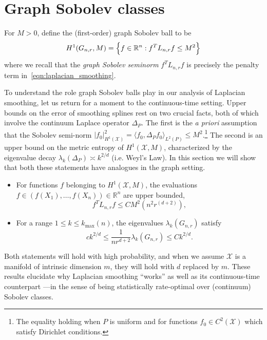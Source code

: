 \documentclass[twoside]{article}
\newcommand{\Reals}{\mathbb{R}}
\newcommand{\1}{\mathbf{1}}
\newcommand{\Lap}{L}
\newcommand{\Xset}{\mathcal{X}}
\newcommand{\Leb}{L}
\theoremstyle{definition}
\theoremstyle{remark}
\begin{document}
\section{Graph Sobolev classes}
\label{sec:graph_sobolev_classes}

For $M > 0$, define the (first-order) graph Sobolev ball to be
\begin{equation}
\label{eqn:graph_sobolev_ball}
H^1(G_{n,r},M) = \Bigl\{f \in \Reals^n: f^T \Lap_{n,r} f \leq M^2\Bigr\}
\end{equation}
where we recall that the \emph{graph Sobolev seminorm} $f^T \Lap_{{n,r}} f$ is precisely the penalty term in~\eqref{eqn:laplacian_smoothing}. 

To understand the role graph Sobolev balls play in our analysis of Laplacian smoothing, let us return for a moment to the continuous-time setting. Upper bounds on the error of smoothing splines rest on two crucial facts, both of which involve the continuum Laplace operator $\Delta_P$. The first is the \textit{a priori} assumption that the Sobolev semi-norm $|f_0|_{H^1(\Xset)}^2 = \langle f_0, \Delta_P f_0 \rangle_{\Leb^2(P)} \leq M^2$.\footnote{The equality holding when $P$ is uniform and  for functions $f_0 \in C^2(\Xset)$ which satisfy Dirichlet conditions.} The second is an upper bound on the metric entropy of $H^1(\Xset,M)$, characterized by the eigenvalue decay $\lambda_k(\Delta_P) \asymp k^{2/d}$ (i.e. Weyl's Law). In this section we will show that both these statements have analogues in the graph setting.
\begin{itemize}
	\item For functions $f$ belonging to $H^1(\Xset,M)$, the evaluations $f \in (f(X_1),\ldots,f(X_n)) \in \Reals^n$ are upper bounded,
	\begin{equation}
	\label{eqn:graph_sobolev_seminorm_vague}
	f^T \Lap_{n,r} f \leq C M^2(n^{2}r^{(d + 2)}),
	\end{equation}
	\item For a range $1 \leq k \leq k_{\max}(n)$, the eigenvalues $\lambda_k(G_{n,r})$ satisfy
	\begin{equation}
	\label{eqn:neighborhood_graph_eigenvalue_vague}
	ck^{2/d} \leq \frac{1}{nr^{d + 2}} \lambda_k(G_{n,r})  \leq Ck^{2/d}.
	\end{equation}
\end{itemize}
Both statements will hold with high probability, and when we assume $\Xset$ is a manifold of intrinsic dimension $m$, they will hold with $d$ replaced by $m$.  These results elucidate why Laplacian smoothing ``works'' as well as its continuous-time counterpart ---in the sense of being statistically rate-optimal over (continuum) Sobolev classes.
\end{document}
